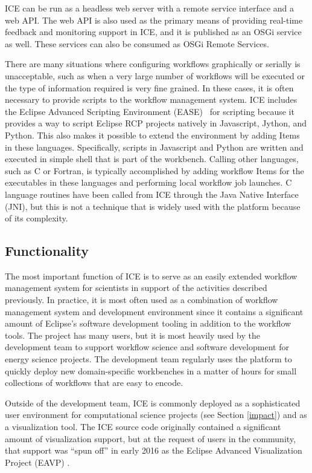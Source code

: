 ICE can be run as a headless web server with a remote service interface and a web
API. The web API is also used as the primary means of providing real-time 
feedback and monitoring support in ICE, and it is published as an OSGi service
as well. These services can also be consumed as OSGi Remote Services.

There are many situations where configuring workflows graphically or serially is
unacceptable, such as when a very large number of workflows will be
executed or the type of information required is very fine grained. In
these cases, it is often necessary to provide scripts to the workflow
management system. ICE includes the Eclipse Advanced Scripting
Environment (EASE)~\cite{pontesegger_eclipse_2015} for scripting because it
provides a way to script Eclipse RCP projects natively in Javascript,
Jython, and Python. This also makes it possible to extend the
environment by adding Items in these languages. Specifically, scripts in
Javascript and Python are written and executed in simple shell that is part of
the workbench. Calling other languages, such as C or Fortran, is typically
accomplished by adding workflow Items for the executables in these languages
and performing local workflow job launches. C language routines have been
called from ICE through the Java Native Interface (JNI), but this is not a
technique that is widely used with the platform because of its complexity.

\subsection{Functionality}\label{software-functionalities}

The most important function of ICE is to serve as an easily extended
workflow management system for scientists in support of
the activities described previously. In practice, it is most often used as a
combination of workflow management system and development environment
since it contains a significant amount of Eclipse's software development
tooling in addition to the workflow tools. The project has many users,
but it is most heavily used by the development team to support workflow
science and software development for energy science projects. The
development team regularly uses the platform to quickly deploy new
domain-specific workbenches in a matter of hours for small collections
of workflows that are easy to encode.

Outside of the development team, ICE is commonly deployed as a sophisticated
user environment for computational science projects (see Section \ref{impact})
and as a visualization tool. The ICE source code originally contained a
significant amount of visualization support, but at the request of users in the
community, that support was ``spun off'' in early 2016 as the Eclipse Advanced
Visualization Project (EAVP) \cite{billings_eclipse_2015}.

